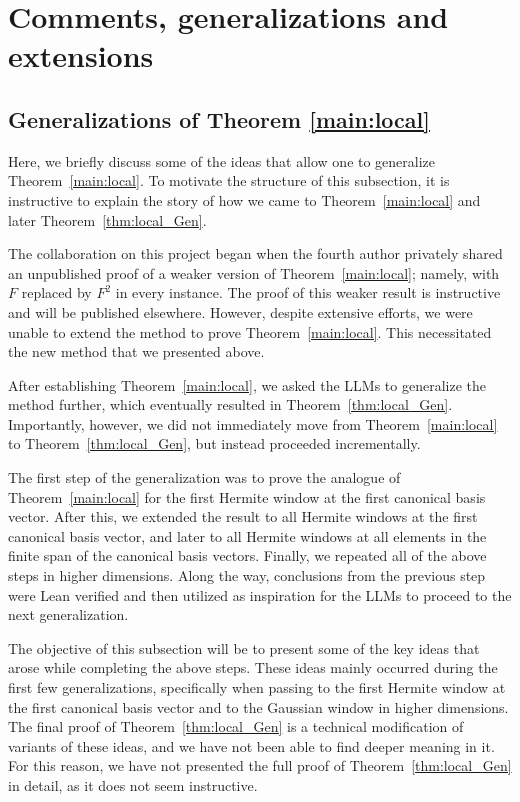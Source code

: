 \documentclass[11pt]{amsart}
\theoremstyle{remark}
\begin{document}
\section{Comments, generalizations and extensions}
\subsection{Generalizations of Theorem \ref{main:local}} Here, we briefly discuss some of the ideas that allow one to generalize Theorem~\ref{main:local}. To motivate the structure of this subsection, it is instructive to explain the story of how we came to Theorem~\ref{main:local} and later Theorem~\ref{thm:local_Gen}.
 \vspace{0.5em}


The collaboration on this project began when the fourth author privately shared an unpublished proof of a weaker version of Theorem~\ref{main:local}; namely,   with $F$ replaced by $F^2$ in every instance. The proof of this weaker result is instructive and will be published elsewhere. However, despite extensive efforts, we were unable to extend the method to prove Theorem~\ref{main:local}. This necessitated the new method that we presented above.
\vspace{0.5em}

After establishing Theorem~\ref{main:local}, we asked the LLMs to generalize the method further, which eventually resulted in Theorem~\ref{thm:local_Gen}. Importantly, however, we did not immediately move from Theorem~\ref{main:local} to Theorem~\ref{thm:local_Gen}, but instead proceeded incrementally. 
\vspace{0.5em}

The first step of the generalization was to prove the analogue of Theorem~\ref{main:local} for the first Hermite window at the first canonical basis vector. After this, we extended the result to all Hermite windows at the first canonical basis vector, and later to all Hermite windows at all elements in the finite span of the canonical basis vectors. Finally, we repeated all of the above steps in higher dimensions. Along the way, conclusions from the previous step were Lean verified and then utilized as inspiration for the LLMs to proceed to the next generalization.
\vspace{0.5em}

The objective of this subsection will be to present some of the key ideas that arose while completing the above steps. These ideas mainly occurred during the first few generalizations, specifically when passing to the first Hermite window at the first canonical basis vector and to the Gaussian window in higher dimensions. The final proof of Theorem~\ref{thm:local_Gen} is a technical modification of variants of these ideas, and we have not been able to find deeper meaning in it. For this reason, we have not presented the full proof of Theorem~\ref{thm:local_Gen} in detail, as it does not seem instructive. 
\vspace{0.5em}
\end{document}
